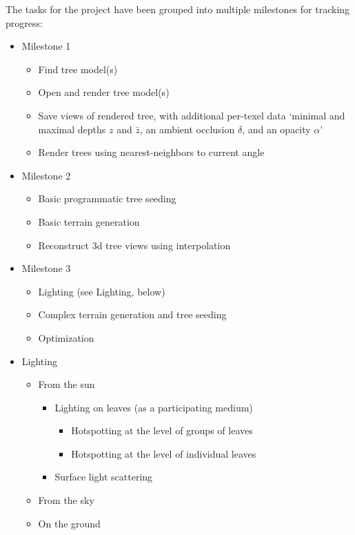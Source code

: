 \documentclass{article}
\begin{document}
The tasks for the project have been grouped into multiple milestones for tracking progress:

\begin{itemize}
\item Milestone 1
\begin{itemize}
\item Find tree model(s)
\item Open and render tree model(s)
\item Save views of rendered tree, with additional per-texel data ‘minimal and maximal depths $z$ and $\bar{z}$, an ambient occlusion $\delta$, and an opacity $\alpha$’\cite{trees}
\item Render trees using nearest-neighbors to current angle
\end{itemize}

\item Milestone 2
\begin{itemize}
\item Basic programmatic tree seeding
\item Basic terrain generation
\item Reconstruct 3d tree views using interpolation
\end{itemize}

\item Milestone 3
\begin{itemize}
\item Lighting (see Lighting, below)
\item Complex terrain generation and tree seeding
\item Optimization
\end{itemize}

\item Lighting
\begin{itemize}
\item From the sun
\begin{itemize}
\item Lighting on leaves (as a participating medium)
\begin{itemize}
\item Hotspotting at the level of groups of leaves
\item Hotspotting at the level of individual leaves
\end{itemize}

\item Surface light scattering
\end{itemize}

\item From the sky
\item On the ground
\end{itemize}

\end{itemize}
\end{document}
